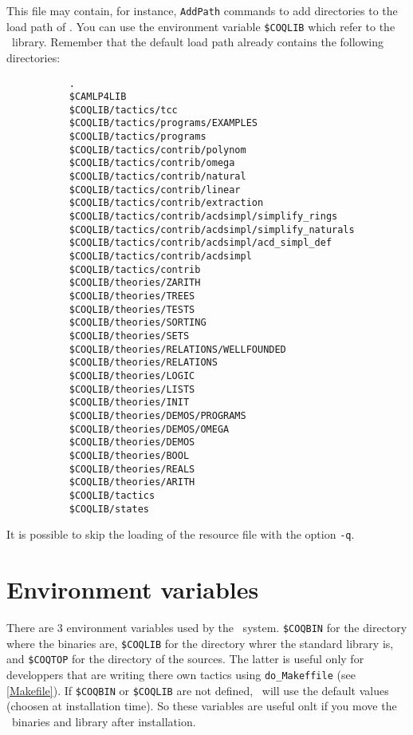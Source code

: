 This file may contain, for instance, \verb:AddPath: commands to add
directories to the load path of \Coq.  You can use the environment
variable \verb:$COQLIB: which refer to the \Coq\
library. Remember that the
default load path already contains the following directories:
\begin{verbatim}
           .
           $CAMLP4LIB
           $COQLIB/tactics/tcc
           $COQLIB/tactics/programs/EXAMPLES
           $COQLIB/tactics/programs
           $COQLIB/tactics/contrib/polynom
           $COQLIB/tactics/contrib/omega
           $COQLIB/tactics/contrib/natural
           $COQLIB/tactics/contrib/linear
           $COQLIB/tactics/contrib/extraction
           $COQLIB/tactics/contrib/acdsimpl/simplify_rings
           $COQLIB/tactics/contrib/acdsimpl/simplify_naturals
           $COQLIB/tactics/contrib/acdsimpl/acd_simpl_def
           $COQLIB/tactics/contrib/acdsimpl
           $COQLIB/tactics/contrib
           $COQLIB/theories/ZARITH
           $COQLIB/theories/TREES
           $COQLIB/theories/TESTS
           $COQLIB/theories/SORTING
           $COQLIB/theories/SETS
           $COQLIB/theories/RELATIONS/WELLFOUNDED
           $COQLIB/theories/RELATIONS
           $COQLIB/theories/LOGIC
           $COQLIB/theories/LISTS
           $COQLIB/theories/INIT
           $COQLIB/theories/DEMOS/PROGRAMS
           $COQLIB/theories/DEMOS/OMEGA
           $COQLIB/theories/DEMOS
           $COQLIB/theories/BOOL
           $COQLIB/theories/REALS
           $COQLIB/theories/ARITH
           $COQLIB/tactics
           $COQLIB/states
\end{verbatim}

It is possible to skip the loading of the resource file with the
option \verb:-q:.

\section{Environment variables}
\label{EnvVariables}

There are 3 environment variables used by the \Coq\ system.
\verb:$COQBIN: for the directory where the binaries are,
\verb:$COQLIB: for the directory whrer the standard library is, and 
\verb:$COQTOP: for the directory of the sources. The latter is useful
only for developpers that are writing there own tactics using
\texttt{do\_Makeffile} (see \ref{Makefile}). If \verb:$COQBIN: or
\verb:$COQLIB: are not defined, \Coq\ will use the default values
(choosen at installation time). So these variables are useful onlt if
you move the \Coq\ binaries and library after installation.

